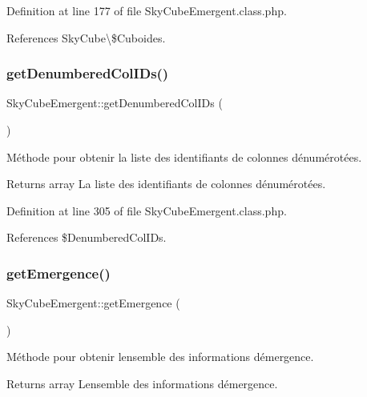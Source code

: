 Definition at line 177 of file Sky\+Cube\+Emergent.\+class.\+php.



References Sky\+Cube\textbackslash{}\$\+Cuboides.

\mbox{\label{class_sky_cube_emergent_a587b7cd54c91f8584640e67b8e92a9be}} 
\subsubsection{\texorpdfstring{get\+Denumbered\+Col\+I\+Ds()}{getDenumberedColIDs()}}
{\footnotesize\ttfamily Sky\+Cube\+Emergent\+::get\+Denumbered\+Col\+I\+Ds (\begin{DoxyParamCaption}{ }\end{DoxyParamCaption})}

Méthode pour obtenir la liste des identifiants de colonnes dénumérotées.

\begin{DoxyReturn}{Returns}
array La liste des identifiants de colonnes dénumérotées. 
\end{DoxyReturn}


Definition at line 305 of file Sky\+Cube\+Emergent.\+class.\+php.



References \$\+Denumbered\+Col\+I\+Ds.

\mbox{\label{class_sky_cube_emergent_aaf96f2ab0f3d08a64fa705bd70e26642}} 
\subsubsection{\texorpdfstring{get\+Emergence()}{getEmergence()}}
{\footnotesize\ttfamily Sky\+Cube\+Emergent\+::get\+Emergence (\begin{DoxyParamCaption}{ }\end{DoxyParamCaption})}

Méthode pour obtenir l\textquotesingle{}ensemble des informations d\textquotesingle{}émergence.

\begin{DoxyReturn}{Returns}
array L\textquotesingle{}ensemble des informations d\textquotesingle{}émergence. 
\end{DoxyReturn}



